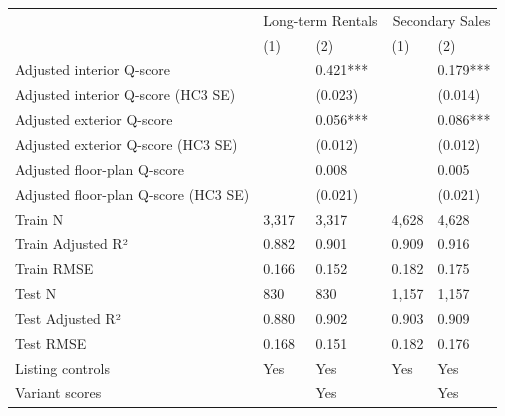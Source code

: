 \begin{tabular}{lllll}
\toprule
 & \multicolumn{2}{r}{Long-term Rentals} & \multicolumn{2}{r}{Secondary Sales} \\
 & (1) & (2) & (1) & (2) \\
\midrule
Adjusted interior Q-score &  & 0.421*** &  & 0.179*** \\
Adjusted interior Q-score (HC3 SE) &  & (0.023) &  & (0.014) \\
Adjusted exterior Q-score &  & 0.056*** &  & 0.086*** \\
Adjusted exterior Q-score (HC3 SE) &  & (0.012) &  & (0.012) \\
Adjusted floor-plan Q-score &  & 0.008 &  & 0.005 \\
Adjusted floor-plan Q-score (HC3 SE) &  & (0.021) &  & (0.021) \\
Train N & 3,317 & 3,317 & 4,628 & 4,628 \\
Train Adjusted R² & 0.882 & 0.901 & 0.909 & 0.916 \\
Train RMSE & 0.166 & 0.152 & 0.182 & 0.175 \\
Test N & 830 & 830 & 1,157 & 1,157 \\
Test Adjusted R² & 0.880 & 0.902 & 0.903 & 0.909 \\
Test RMSE & 0.168 & 0.151 & 0.182 & 0.176 \\
Listing controls & Yes & Yes & Yes & Yes \\
Variant scores &  & Yes &  & Yes \\
\bottomrule
\end{tabular}
